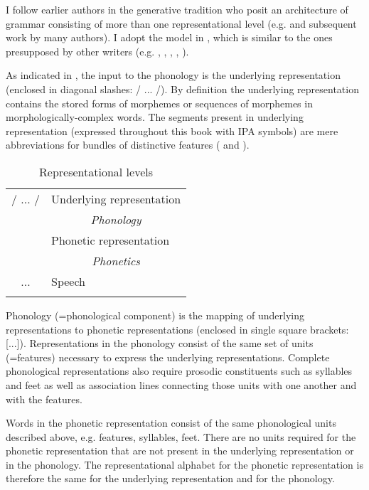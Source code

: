 I follow earlier authors in the generative tradition who posit an architecture of grammar consisting of more than one representational level (e.g. \citealt{ChomskyHalle1968} and subsequent work by many authors). I adopt the model in , which is similar to the ones presupposed by other writers (e.g. \citealt{Keating1990}, \citealt{Cohn1993}, \citealt{Keating1996}, \citealt{HaleReiss2015}, \citealt{Bermúdez-Otero2015}).

As indicated in , the input to the phonology is the underlying representation (enclosed in diagonal slashes: / ... /). By definition the underlying representation contains the stored forms of morphemes or sequences of morphemes in morphologically-complex words. The segments present in underlying representation (expressed throughout this book with IPA symbols) are mere abbreviations for bundles of distinctive features ( and ).

\begin{table}
\caption{Representational levels\label{tab:fromfig:representationallevels}}
\begin{tabular}{cl}
\lsptoprule
/ ... / & Underlying representation\\
 & \multicolumn{1}{c}{\itshape Phonology} \\\relax
[ ... ] & Phonetic representation\\
 & \multicolumn{1}{c}{\itshape Phonetics}\\
... & Speech\\
\lspbottomrule
\end{tabular}
\end{table}

Phonology (=phonological component) is the mapping of underlying representations to phonetic representations (enclosed in single square brackets: [...]). Representations in the phonology consist of the same set of units (=features) necessary to express the underlying representations. Complete phonological representations also require prosodic constituents such as syllables and feet as well as association lines connecting those units with one another and with the features.

Words in the phonetic representation consist of the same phonological units described above, e.g. features, syllables, feet. There are no units required for the phonetic representation that are not present in the underlying representation or in the phonology. The representational alphabet for the phonetic representation is therefore the same for the underlying representation and for the phonology.

